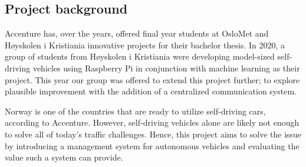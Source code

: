 \subsection{Project background}
Accenture has, over the years, offered final year students at OsloMet and Høyskolen i Kristiania innovative projects for their bachelor thesis. In 2020, a group of students from Høyskolen i Kristiania were developing model-sized self-driving vehicles using Raspberry Pi in conjunction with machine learning as their project. This year our group was offered to extend this project further; to explore plausible improvement with the addition of a centralized communication system.

Norway is one of the countries that are ready to utilize self-driving cars, according to Accenture. However, self-driving vehicles alone are likely not enough to solve all of today's traffic challenges. Hence, this project aims to solve the issue by introducing a management system for autonomous vehicles and evaluating the value such a system can provide.
